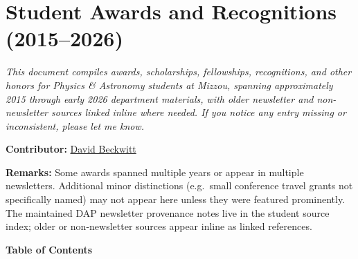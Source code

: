 \section*{Student Awards and Recognitions (2015--2026)}

\noindent
\emph{This document compiles awards, scholarships, fellowships, recognitions,
and other honors for Physics \& Astronomy students at Mizzou,
spanning approximately 2015 through early 2026 department materials,
with older newsletter and non-newsletter sources linked inline where needed.
If you notice any entry missing or inconsistent, please let me know.}

\medskip
\noindent
\textbf{Contributor:} \href{https://www.linkedin.com/in/dvbeckwitt/}{David Beckwitt}

\medskip
\textbf{Remarks:}
Some awards spanned multiple years or appear in multiple newsletters.
Additional minor distinctions (e.g.\ small conference travel grants not
specifically named) may not appear here unless they were featured prominently.
The maintained DAP newsletter provenance notes live in the student source
index; older or non-newsletter sources appear inline as linked references.

\vspace{4em}
\noindent
\textbf{Table of Contents}
\smallskip

\printstudentindex

\bigskip


\bigskip
\pagebreak
